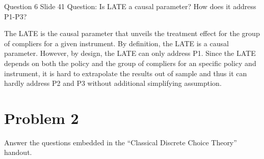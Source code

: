 \documentclass{article}
\begin{document}
\begin{problem}{Question 6 Slide 41}
Question: Is LATE a causal parameter? How does it address P1-P3?
\end{problem}
\begin{solution}
The LATE is the causal parameter that unveils the treatment effect for the group of compliers for a given instrument. By definition, the LATE is a causal parameter. However, by design, the LATE can only address P1. Since the LATE depends on both the policy and the group of compliers for an specific policy and instrument, it is hard to extrapolate the results out of sample and thus it can hardly address P2 and P3 without additional simplifying assumption. 
\end{solution}

\newpage
\section*{Problem 2}
Answer the questions embedded in the ``Classical Discrete Choice Theory'' handout.
\end{document}
